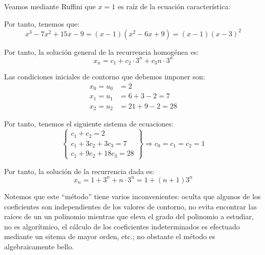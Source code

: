 \begin{ejercicio}
    Veamos mediante Ruffini que $x=1$ es raíz de la ecuación característica:
    \begin{figure}[H]
        \centering
    \end{figure}

    Por tanto, tenemos que:
    \begin{equation*}
        x^3 - 7x^2 + 15x - 9 = (x-1)(x^2 - 6x + 9) = (x-1)(x-3)^2
    \end{equation*}

    Por tanto, la solución general de la recurrencia homogénea es:
    \begin{equation*}
        x_n = c_1 + c_2\cdot 3^n + c_3n\cdot 3^n
    \end{equation*}

    Las condiciones iniciales de contorno que debemos imponer son:
    \begin{align*}
        x_0=u_0&= 2\\
        x_1=u_1&= 6 + 3 - 2 = 7\\
        x_2=u_2&= 21 + 9 - 2 = 28
    \end{align*}

    Por tanto, tenemos el siguiente sistema de ecuaciones:
    \begin{equation*}
        \left\{\begin{array}{l}
            c_1 + c_2 = 2 \\
            c_1 + 3c_2 + 3c_3 = 7 \\
            c_1 + 9c_2 + 18c_3 = 28
        \end{array}\right\} \Longrightarrow c_0=c_1=c_2=1
    \end{equation*}

    Por tanto, la solución de la recurrencia dada es:
    \begin{equation*}
        x_n = 1 + 3^n + n\cdot 3^n = 1 + (n+1)3^n
    \end{equation*}

    \begin{observacion}
        Notemos que este ``método'' tiene varios inconvenientes:
        oculta que algunos de los coeficientes son independientes de los valores de contorno,
        no evita encontrar las raíces de un un polinomio mientras que eleva el grado del polinomio a estudiar,
        no es algorítmico,
        el cálculo de los coeficientes indeterminados es efectuado mediante un sitema de mayor orden, etc.;
        no obstante el método es algebraicamente bello.
    \end{observacion}
\end{ejercicio}


